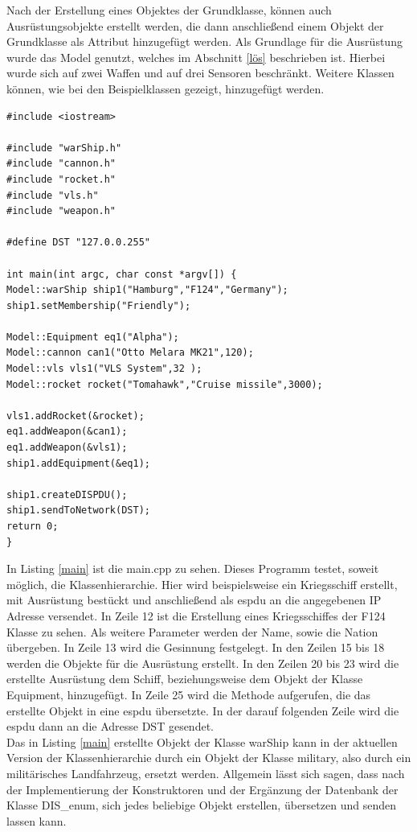 Nach der Erstellung eines Objektes der Grundklasse, können auch Ausrüstungsobjekte erstellt werden, die dann anschließend einem Objekt der Grundklasse als Attribut hinzugefügt werden. Als Grundlage für die Ausrüstung wurde das Model genutzt, welches im Abschnitt \ref{lös} beschrieben ist. Hierbei wurde sich auf zwei Waffen und auf drei Sensoren beschränkt. Weitere Klassen können, wie bei den Beispielklassen gezeigt, hinzugefügt werden. \\
\begin{lstlisting}[caption = main.cpp ,label= main]
#include <iostream>

#include "warShip.h"
#include "cannon.h"
#include "rocket.h"
#include "vls.h"
#include "weapon.h"

#define DST "127.0.0.255"

int main(int argc, char const *argv[]) {
Model::warShip ship1("Hamburg","F124","Germany");
ship1.setMembership("Friendly");

Model::Equipment eq1("Alpha");
Model::cannon can1("Otto Melara MK21",120);
Model::vls vls1("VLS System",32 );
Model::rocket rocket("Tomahawk","Cruise missile",3000);

vls1.addRocket(&rocket);
eq1.addWeapon(&can1);
eq1.addWeapon(&vls1);
ship1.addEquipment(&eq1);

ship1.createDISPDU();
ship1.sendToNetwork(DST);
return 0;
}
\end{lstlisting}
In Listing \ref{main} ist die main.cpp zu sehen. Dieses Programm testet, soweit möglich, die Klassenhierarchie. Hier wird beispielsweise ein Kriegsschiff erstellt, mit Ausrüstung  bestückt und anschließend als \ac{espdu} an die angegebenen IP Adresse versendet.
In Zeile 12 ist die Erstellung eines Kriegsschiffes der F124 Klasse zu sehen. Als weitere Parameter werden der Name, sowie die Nation übergeben. In Zeile 13 wird die Gesinnung festgelegt.   In den Zeilen 15 bis 18 werden die Objekte für die Ausrüstung erstellt. In den Zeilen 20 bis 23 wird die erstellte Ausrüstung dem Schiff, beziehungsweise dem Objekt der Klasse \glqq Equipment\grqq{}, hinzugefügt. In Zeile 25 wird die Methode aufgerufen, die das erstellte Objekt in eine \ac{espdu} übersetzte. In der darauf folgenden Zeile wird die \ac{espdu} dann an die Adresse \glqq DST\grqq{} gesendet.\\ 
Das in Listing \ref{main} erstellte Objekt der Klasse \glqq warShip\grqq{} kann in der aktuellen Version der Klassenhierarchie durch ein Objekt der Klasse \glqq military\grqq{}, also durch ein militärisches Landfahrzeug, ersetzt werden. Allgemein lässt sich sagen, dass nach der Implementierung der Konstruktoren und der Ergänzung der Datenbank der Klasse \glqq DIS\_enum\grqq{}, sich jedes beliebige Objekt erstellen, übersetzen und senden lassen kann.  

